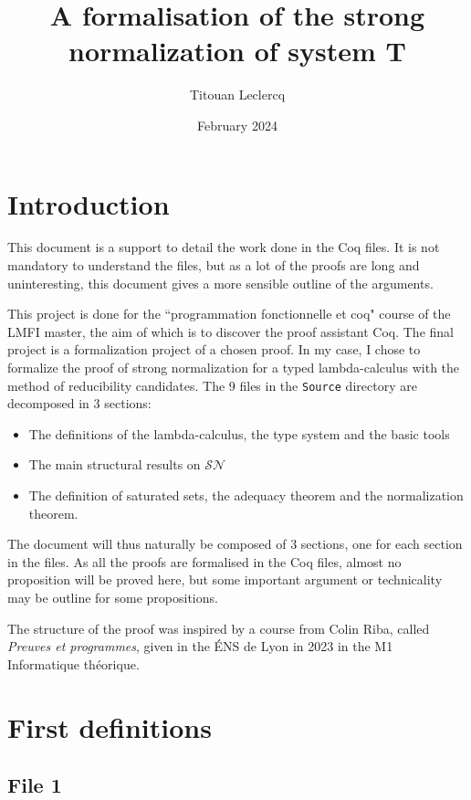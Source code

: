 \documentclass{article}
\title{A formalisation of the strong normalization of system T}
\author{Titouan Leclercq}
\date{February 2024}
\newcommand{\SN}[0]{\mathcal{SN}}
\theoremstyle{definition}
\begin{document}
\maketitle

\section*{Introduction}

This document is a support to detail the work done in the Coq files. It is not mandatory to understand the
files, but as a lot of the proofs are long and uninteresting, this document gives a more sensible outline of
the arguments.

This project is done for the ``programmation fonctionnelle et coq" course of the LMFI master, the aim of
which
is to discover the proof assistant Coq. The final project is a formalization project of a chosen proof. In my
case, I chose to formalize the proof of strong normalization for a typed lambda-calculus with the method of
reducibility candidates. The 9 files in the \texttt{Source} directory are decomposed in 3 sections:
\begin{itemize}
    \item The definitions of the lambda-calculus, the type system and the basic tools
    \item The main structural results on $\SN$
    \item The definition of saturated sets, the adequacy theorem and the normalization theorem.
\end{itemize}

The document will thus naturally be composed of 3 sections, one for each section in the files. As all the
proofs are formalised in the Coq files, almost no proposition will be proved here, but some important
argument or technicality may be outline for some propositions.

The structure of the proof was inspired by a course from Colin Riba, called \textit{Preuves et programmes},
given in the \'ENS de Lyon in 2023 in the M1 Informatique théorique.

\section{First definitions}

\subsection{File 1}
\end{document}
